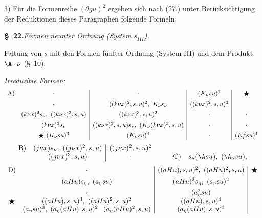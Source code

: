3) Für die Formenreihe $(\theta gu)^2$ ergeben sich nach (27.) unter Berücksichtigung der Reduktionen dieses Paragraphen folgende Formeln:

\begin{center}
\textbf{\S\ 22.}\quad\emph{Formen neunter Ordnung (System $s_{III}$).}
\end{center}

Faltung von $s$ mit den Formen fünfter Ordnung (System III) und dem Produkt $\A\cdot \nu$ (\S\ 10).

\noindent\emph{Irreduzible Formen:}
\[
\begin{array}{c@{\quad}c|c|c|c}
\text{A)}& \cdot & \cdot & (K_\nu su)^2 & \bigstar\\[0.45em]
& \cdot & ((k\nu x)^2,s,u)^2,\ K_\nu s_\nu & ((k\nu x)^2,s,u)^3 & \\[0.45em]
& (k\nu x)^2s_\nu,\ ((k\nu x)^3,s,u) & ((k\nu x)^3,s,u)^2 & \cdot & \cdot\\[0.45em]
& (k\nu x)^3s_\nu & ((k\nu x)^3,s,u)s_\nu,\ (K_\nu(k\nu x)^3,s,u) & \cdot & \cdot\\[0.45em]
& \bigstar\ (K_\nu su)^3 & (K_\nu su)^4 & \cdot & (K_\nu^2su)^4
\end{array}
\]
\[
\begin{array}{c@{\quad}c|c@{\qquad}c@{\quad}c}
\text{B)}& (j\nu x)s_\nu,\ ((j\nu x)^2,s,u) & ((j\nu x)^2,s,u)^2 && \\
& ((j\nu x)^3,s,u) & \cdot && \text{C)}\quad s_\nu(\A su),\ (\A_\nu su),
\end{array}
\]
\[
\begin{array}{c@{\quad}c|c|c}
\text{D)}& \cdot & ((aHu),s,u)^2,\ ((aHu)^2,s,u) & \bigstar\\[0.45em]
& (aHu)s_\eta,\ (a_\eta su) & (aHu)^2s_\eta,\ (a_\eta su)^2 & \\[0.45em]
& \cdot & (a_\eta^2su) & \\
\bigstar& ((aHu),s,u)^3,\ ((aHu)^2,s,u)^2 & ((aHu),s,u)^4 & \\
& (a_\eta su)^3,\ (a_\eta(aHu),s,u)^2,\ (a_\eta(aHu)^2,s,u) & (a_\eta(aHu),s,u)^3 &
\end{array}
\]


